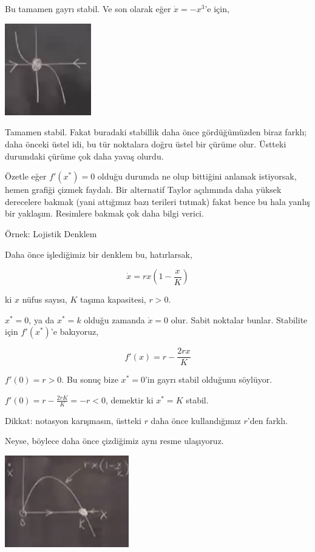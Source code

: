 \documentclass[12pt,fleqn]{article}\usepackage{../../common}
\begin{document}
Bu tamamen gayrı stabil. Ve son olarak eğer $\dot{x} = -x^3$'e için,

\includegraphics[height=4cm]{02_06.png}

Tamamen stabil. Fakat buradaki stabillik daha önce gördüğümüzden biraz farklı;
daha önceki üstel idi, bu tür noktalara doğru üstel bir çürüme olur. Üstteki
durumdaki çürüme çok daha yavaş olurdu.

Özetle eğer $f'(x^\ast)=0$ olduğu durumda ne olup bittiğini anlamak istiyorsak,
hemen grafiği çizmek faydalı. Bir alternatif Taylor açılımında daha yüksek
derecelere bakmak (yani attığımız bazı terileri tutmak) fakat bence bu hala
yanlış bir yaklaşım. Resimlere bakmak çok daha bilgi verici.

Örnek: Lojistik Denklem

Daha önce işlediğimiz bir denklem bu, hatırlarsak,

$$ \dot{x} = rx ( 1 - \frac{x}{K}) $$

ki $x$ nüfus sayısı, $K$ taşıma kapasitesi, $r > 0$.

$x^\ast=0$, ya da $x^\ast=k$ olduğu zamanda $\dot{x}=0$ olur. Sabit noktalar
bunlar. Stabilite için $f'(x^\ast)$'e bakıyoruz,

$$ f'(x) = r - \frac{2rx}{K} $$

$f'(0) = r > 0$. Bu sonuç bize $x^\ast=0$'in gayrı stabil olduğunu söylüyor. 

$f'(0) = r - \frac{2rK}{K} = -r < 0$, demektir ki $x^\ast=K$ stabil. 

Dikkat: notasyon karışmasın, üstteki $r$ daha önce kullandığımız $r$'den
farklı.

Neyse, böylece daha önce çizdiğimiz aynı resme ulaşıyoruz.

\includegraphics[height=4cm]{../chaos_01/1_09.png}
\end{document}
